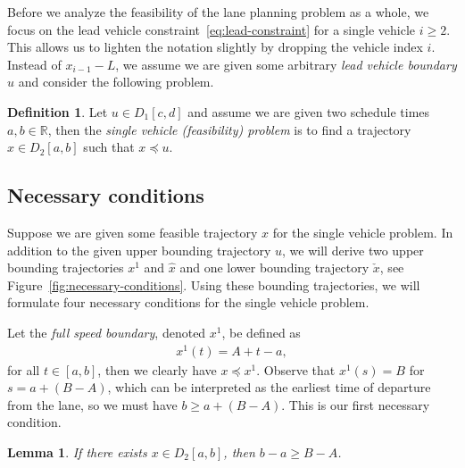 \documentclass[a4paper]{report}
\theoremstyle{definition}
\newtheorem{define}{Definition}[chapter]
\theoremstyle{plain}
\newtheorem{lemma}{Lemma}[chapter]
\begin{document}
Before we analyze the feasibility of the lane planning problem as a whole, we
focus on the lead vehicle constraint~\eqref{eq:lead-constraint} for a single
vehicle $i \geq 2$.
%
This allows us to lighten the notation slightly by dropping the vehicle index
$i$. Instead of $x_{i-1} - L$, we assume we are given some arbitrary \emph{lead vehicle boundary}
$u$ and consider the following problem.

\begin{define}
  Let $u \in D_{1}[c, d]$ and assume we are given two schedule times
  $a,b \in \mathbb{R}$, then the \emph{single vehicle (feasibility) problem} is to find
  a trajectory $x \in D_{2}[a,b]$ such that $x \preceq u$.
\end{define}

\subsection{Necessary conditions}

Suppose we are given some feasible trajectory $x$ for the single vehicle
problem.
%
In addition to the given upper bounding trajectory $u$, we will derive two
upper bounding trajectories $x^{1}$ and $\hat{x}$ and one lower bounding
trajectory $\check{x}$, see Figure~\ref{fig:necessary-conditions}.
%
Using these bounding trajectories, we will formulate four necessary conditions
for the single vehicle problem.

Let the \emph{full speed boundary}, denoted $x^{1}$, be defined as
\begin{align}
  x^{1}(t) = A + t - a,
\end{align}
for all $t \in [a, b]$, then we clearly have $x \preceq x^{1}$. Observe that
$x^{1}(s) = B$ for $s = a + (B-A)$, which can be interpreted as the earliest
time of departure from the lane, so we must have $b \geq a + (B-A)$. This is our
first necessary condition.
%
\begin{lemma}\label{lemma:travel-constraint}
  If there exists $x\in D_{2}[a,b]$, then $b-a \geq B-A$.
\end{lemma}
\end{document}
